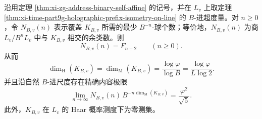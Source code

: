 \begin{theorem}\label{thm:xi-zg-address-minkowski-dimension-content}
沿用定理 \ref{thm:xi-zg-address-binary-self-affine} 的记号，并在 \(L_v\) 上取定理 \ref{thm:xi-time-part9g-holographic-prefix-isometry-on-line} 的 \(B\)-进超度量。对 \(n\ge 0\)，令 \(N_{B,v}(n)\) 表示覆盖 \(K_{B,v}\) 所需的最少 \(B^{-n}\)-球个数；等价地，\(N_{B,v}(n)\) 为商 \(L_v/B^nL_v\) 中与 \(K_{B,v}\) 相交的余类数。则
\[
\boxed{\;
N_{B,v}(n)=F_{n+2}\qquad (n\ge 0).\;}
\]
从而
\[
\boxed{\;
\dim_{\mathrm H}(K_{B,v})
=
\dim_{\mathrm M}(K_{B,v})
=
\frac{\log\varphi}{\log B}
=
\frac{\log\varphi}{L\log 2}.\;}
\]
并且沿自然 \(B\)-进尺度存在精确内容极限
\[
\boxed{\;
\lim_{n\to\infty}
N_{B,v}(n)\,B^{-n\dim_{\mathrm M}(K_{B,v})}
=
\frac{\varphi^2}{\sqrt5}.\;}
\]
此外，\(K_{B,v}\) 在 \(L_v\) 的 Haar 概率测度下为零测集。
\end{theorem}
